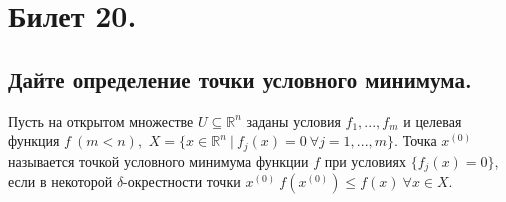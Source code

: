 \section{Билет 20.}

\subsection{Дайте определение точки условного минимума.}
\begin{definition}
    Пусть на открытом множестве $U \subseteq \mathbb{R}^n$ заданы условия $f_1, ..., f_m$ и целевая функция $f \> (m < n),$ $X = \{x \in \mathbb{R}^n \> | \> f_j(x) = 0 \> \forall j = 1, ..., m \}$. Точка $x^{(0)}$ называется точкой условного минимума функции $f$ при условиях $\{f_j(x) = 0\}$, если в некоторой $\delta$-окрестности точки $x^{(0)} \> f(x^{(0)}) \leqslant f(x) \> \forall x \in X$.
\end{definition}